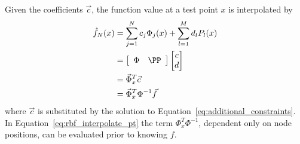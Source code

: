 Given the coefficients $\vec{c}$, the function value at a test point $x$ is interpolated by
\begin{align}	 
	\hat{f}_N(x) &= \sum_{j=1}^{N}c_j \Phi_j(x) + \sum_{l=1}^{M}d_l P_l(x)  \nonumber \\
	&=  \left[\begin{array}{cc}
        \Phi & \PP
	\end{array} \right] 
	 \begin{bmatrix}	c \\
					d
		 \end{bmatrix} \nonumber \\
						 &= \vec{\Phi}_x^T \vec{c} \nonumber \\
						 &= \vec{\Phi}_x^T \Phi^{-1}\vec{f}	
						 \label{eq:rbf_interpolate_pt}
\end{align}
where $\vec{c}$ is substituted by the solution to Equation~\ref{eq:additional_constraints}. In Equation~\ref{eq:rbf_interpolate_pt} the term $\Phi_{x}^T\Phi^{-1}$, dependent only on node positions, can be evaluated prior to knowing $f$. 

